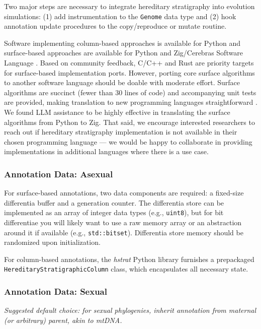 Two major steps are necessary to integrate hereditary stratigraphy into evolution simulations: (1) add instrumentation to the \texttt{Genome} data type and (2) hook annotation update procedures to the copy/reproduce or mutate routine.

Software implementing column-based approaches is available for Python \citep{moreno2022hstrat} and surface-based approaches are available for Python \citep{moreno2024hsurf} and Zig/Cerebras Software Language \citep{moreno2024wse}.
Based on community feedback, C/C++ and Rust are priority targets for surface-based implementation ports.
However, porting core surface algorithms to another software language should be doable with moderate effort.
Surface algorithms are succinct (fewer than 30 lines of code) and accompanying unit tests are provided, making translation to new programming languages straightforward \citep{moreno2024algorithms}.
We found LLM assistance to be highly effective in translating the surface algorithms from Python to Zig.
That said, we encourage interested researchers to reach out if hereditary stratigraphy implementation is not available in their chosen programming language --- we would be happy to collaborate in providing implementations in additional languages where there is a use case.

\subsubsection{Annotation Data: Asexual}

For surface-based annotations, two data components are required: a fixed-size differentia buffer and a generation counter.
The differentia store can be implemented as an array of integer data types (e.g., \texttt{uint8}), but for bit differentiae you will likely want to use a raw memory array or an abstraction around it if available (e.g., \texttt{std::bitset}).
Differentia store memory should be randomized upon initialization.

For column-based annotations, the \textit{hstrat} Python library furnishes a prepackaged \texttt{HereditaryStratigraphicColumn} class, which encapsulates all necessary state.

\subsubsection{Annotation Data: Sexual}
\textit{Suggested default choice: for sexual phylogenies, inherit annotation from maternal (or arbitrary) parent, akin to mtDNA.}

